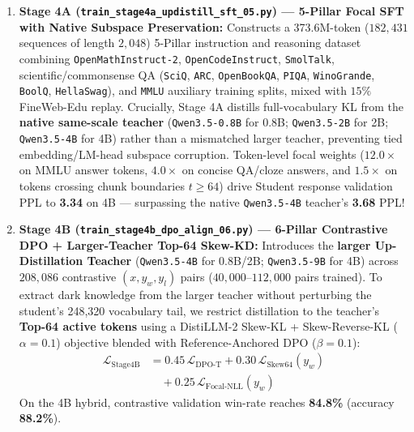 \documentclass[twocolumn,10pt]{article}
\begin{document}
\begin{enumerate}
    \item \textbf{Stage 4A (\texttt{train\_stage4a\_updistill\_sft\_05.py}) --- 5-Pillar Focal SFT with Native Subspace Preservation:}
    Constructs a 373.6M-token ($182,431$ sequences of length $2,048$) 5-Pillar instruction and reasoning dataset combining \texttt{OpenMathInstruct-2}, \texttt{OpenCodeInstruct}, \texttt{SmolTalk}, scientific/commonsense QA (\texttt{SciQ}, \texttt{ARC}, \texttt{OpenBookQA}, \texttt{PIQA}, \texttt{WinoGrande}, \texttt{BoolQ}, \texttt{HellaSwag}), and \texttt{MMLU} auxiliary training splits, mixed with $15\%$ FineWeb-Edu replay. Crucially, Stage 4A distills full-vocabulary KL from the \textbf{native same-scale teacher} (\texttt{Qwen3.5-0.8B} for 0.8B; \texttt{Qwen3.5-2B} for 2B; \texttt{Qwen3.5-4B} for 4B) rather than a mismatched larger teacher, preventing tied embedding/LM-head subspace corruption. Token-level focal weights ($12.0\times$ on MMLU answer tokens, $4.0\times$ on concise QA/cloze answers, and $1.5\times$ on tokens crossing chunk boundaries $t \ge 64$) drive Student response validation PPL to \textbf{3.34} on 4B --- surpassing the native \texttt{Qwen3.5-4B} teacher's \textbf{3.68} PPL!

    \item \textbf{Stage 4B (\texttt{train\_stage4b\_dpo\_align\_06.py}) --- 6-Pillar Contrastive DPO + Larger-Teacher Top-64 Skew-KD:}
    Introduces the \textbf{larger Up-Distillation Teacher} (\texttt{Qwen3.5-4B} for 0.8B/2B; \texttt{Qwen3.5-9B} for 4B) across $208,086$ contrastive $(x, y_w, y_l)$ pairs ($40,000$--$112,000$ pairs trained). To extract dark knowledge from the larger teacher without perturbing the student's 248,320 vocabulary tail, we restrict distillation to the teacher's \textbf{Top-64 active tokens} using a DistiLLM-2 Skew-KL + Skew-Reverse-KL ($\alpha=0.1$) objective blended with Reference-Anchored DPO ($\beta=0.1$):
    \begin{align}
    \mathcal{L}_{\text{Stage4B}} &= 0.45 \, \mathcal{L}_{\text{DPO-T}} + 0.30 \, \mathcal{L}_{\text{Skew64}}(y_w) \nonumber \\
    &\quad + 0.25 \, \mathcal{L}_{\text{Focal-NLL}}(y_w)
    \end{align}
    On the 4B hybrid, contrastive validation win-rate reaches \textbf{84.8\%} (accuracy \textbf{88.2\%}).


\end{enumerate}
\end{document}
